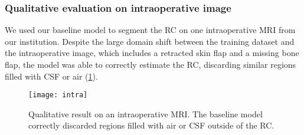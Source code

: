 \subsubsection{Qualitative evaluation on intraoperative image}

We used our baseline model to segment the \ac{RC} on one intraoperative \ac{MRI} from our institution.
Despite the large domain shift between the training dataset and the intraoperative image, which includes a retracted skin flap and a missing bone flap, the model was able to correctly estimate the \ac{RC}, discarding similar regions filled with \ac{CSF} or air (\cref{fig:intra}).

\begin{figure}
  \centering
  \texttt{[image: intra]}
  \caption[Qualitative result on an intraoperative \acs{MRI}]{
    Qualitative result on an intraoperative \ac{MRI}.
    The baseline model correctly discarded regions filled with air or \ac{CSF} outside of the \ac{RC}.
  }
  \label{fig:intra}
\end{figure}
